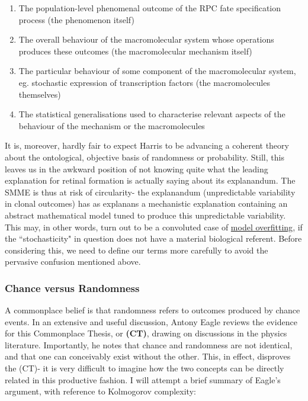 \begin{enumerate}
\item The population-level phenomenal outcome of the RPC fate specification process (the phenomenon itself)
\item The overall behaviour of the macromolecular system whose operations produces these outcomes (the macromolecular mechanism itself)
\item The particular behaviour of some component of the macromolecular system, eg. stochastic expression of transcription factors (the macromolecules themselves)
\item The statistical generalisations used to characterise relevant aspects of the behaviour of the mechanism or the macromolecules
\end{enumerate}

It is, moreover, hardly fair to expect Harris to be advancing a coherent theory about the ontological, objective basis of randomness or probability. Still, this leaves us in the awkward position of not knowing quite what the leading explanation for retinal formation is actually saying about its explanandum. The SMME is thus at risk of circularity- the explanandum (unpredictable variability in clonal outcomes) has as explanans a mechanistic explanation containing an abstract mathematical model tuned to produce this unpredictable variability. This may, in other words, turn out to be a convoluted case of \hyperref[fitting]{model overfitting}, if the ``stochasticity" in question does not have a material biological referent. Before considering this, we need to define our terms more carefully to avoid the pervasive confusion mentioned above.

\subsubsection{Chance versus Randomness}
A commonplace belief is that randomness refers to outcomes produced by chance events. In an extensive and useful discussion, Antony Eagle reviews the evidence for this Commonplace Thesis, or \textbf{(CT)}\cite{Eagle2018}, drawing on discussions in the physics literature. Importantly, he notes that chance and randomness are not identical, and that one can conceivably exist without the other. This, in effect, disproves the (CT)- it is very difficult to imagine how the two concepts can be directly related in this productive fashion. I will attempt a brief summary of Eagle's argument, with reference to Kolmogorov complexity:

